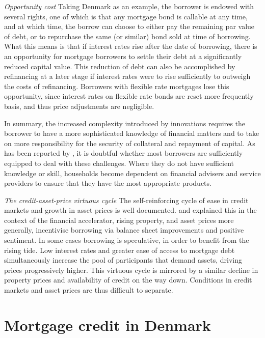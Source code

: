 \documentclass[
]{book}
\begin{document}
\emph{Opportunity cost}\newline
Taking Denmark as an example, the borrower is endowed with several rights, one of which is that any mortgage bond is callable at any time, and at which time, the borrow can choose to either pay the remaining par value of debt, or to repurchase the same (or similar) bond sold at time of borrowing. What this means is that if interest rates rise after the date of borrowing, there is an opportunity for mortgage borrowers to settle their debt at a significantly reduced capital value. This reduction of debt can also be accomplished by refinancing at a later stage if interest rates were to rise sufficiently to outweigh the costs of refinancing. Borrowers with flexible rate mortgages lose this opportunity, since interest rates on flexible rate bonds are reset more frequently basis, and thus price adjustments are negligible.

In summary, the increased complexity introduced by innovations requires the borrower to have a more sophisticated knowledge of financial matters and to take on more responsibility for the security of collateral and repayment of capital. As has been reported by \citet{scanlon2008}, it is doubtful whether most borrowers are sufficiently equipped to deal with these challenges. Where they do not have sufficient knowledge or skill, households become dependent on financial advisers and service providers to ensure that they have the most appropriate products.

\emph{The credit-asset-price virtuous cycle}\newline
The self-reinforcing cycle of ease in credit markets and growth in asset prices is well documented. \citet{Bernanke1999a} and \citet{disyatat2011} explained this in the context of the financial accelerator, rising property, and asset prices more generally, incentivise borrowing via balance sheet improvements and positive sentiment. In some cases borrowing is speculative, in order to benefit from the rising tide. Low interest rates and greater ease of access to mortgage debt simultaneously increase the pool of participants that demand assets, driving prices progressively higher. This virtuous cycle is mirrored by a similar decline in property prices and availability of credit on the way down. Conditions in credit markets and asset prices are thus difficult to separate.

\hypertarget{sec:fi-fl-rk-dk}{%
\section{Mortgage credit in Denmark}\label{sec:fi-fl-rk-dk}}
\end{document}
